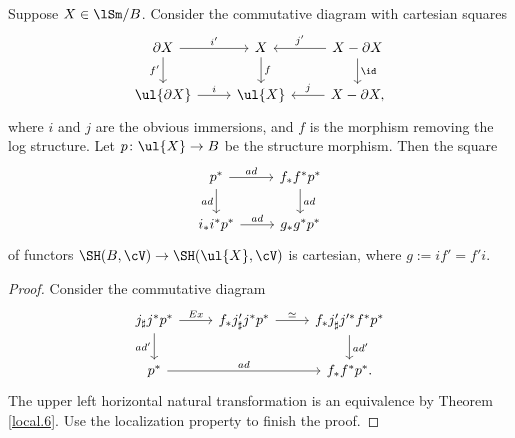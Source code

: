 \documentclass[10pt]{amsart}
\begin{document}
\begin{thm}
\label{local.8}
Suppose $X\in \lSm/B$.
Consider the commutative diagram with cartesian squares
\[
\begin{tikzcd}
\partial X\ar[r,"i'"]\ar[d,"f'"']&
X\ar[d,"f"]\ar[r,leftarrow,"j'"]&
X-\partial X\ar[d,"\id"]
\\
\ul{\partial X}\ar[r,"i"]&
\ul{X}\ar[r,leftarrow,"j"]&
X-\partial X,
\end{tikzcd}
\]
where $i$ and $j$ are the obvious immersions, and $f$ is the morphism removing the log structure.
Let $p\colon \ul{X}\to B$ be the structure morphism.
Then the square
\[
\begin{tikzcd}
p^* \ar[r,"ad"]\ar[d,"ad"']&
f_*f^*p^*\ar[d,"ad"]
\\
i_*i^*p^*\ar[r,"ad"]&
g_*g^*p^*
\end{tikzcd}
\]
of functors $\SH(B,\cV)\to \SH(\ul{X},\cV)$ is cartesian, where $g:=if'=f'i$.
\end{thm}
\begin{proof}
Consider the commutative diagram
\[
\begin{tikzcd}
j_\sharp j^*p^*\ar[r,"Ex"]\ar[d,"ad'"']&
f_* j_\sharp' j^*p^*\ar[r,"\simeq"]&
f_*j_\sharp' j'^* f^*p^*\ar[d,"ad'"]
\\
p^*\ar[rr,"ad"]&
&
f_*f^*p^*.
\end{tikzcd}
\]
The upper left horizontal natural transformation is an equivalence by Theorem \ref{local.6}.
Use the localization property to finish the proof.
\end{proof}
\end{document}

